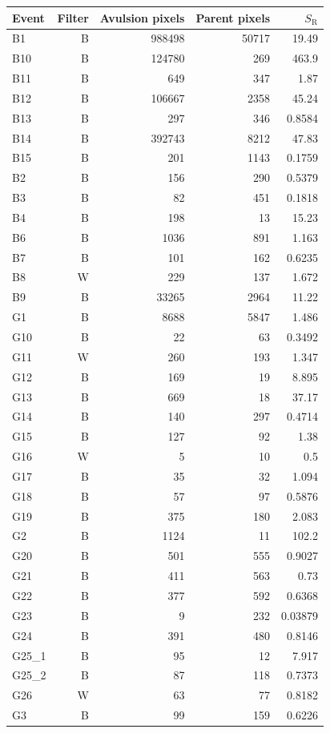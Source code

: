 \small\begin{longtable}{lrrrr}
\toprule Event & Filter & Avulsion pixels & Parent pixels & $S_{\mathrm R}$\\\midrule\endhead
B1 & B & 988498 & 50717 & 19.49\\
B10 & B & 124780 & 269 & 463.9\\
B11 & B & 649 & 347 & 1.87\\
B12 & B & 106667 & 2358 & 45.24\\
B13 & B & 297 & 346 & 0.8584\\
B14 & B & 392743 & 8212 & 47.83\\
B15 & B & 201 & 1143 & 0.1759\\
B2 & B & 156 & 290 & 0.5379\\
B3 & B & 82 & 451 & 0.1818\\
B4 & B & 198 & 13 & 15.23\\
B6 & B & 1036 & 891 & 1.163\\
B7 & B & 101 & 162 & 0.6235\\
B8 & W & 229 & 137 & 1.672\\
B9 & B & 33265 & 2964 & 11.22\\
G1 & B & 8688 & 5847 & 1.486\\
G10 & B & 22 & 63 & 0.3492\\
G11 & W & 260 & 193 & 1.347\\
G12 & B & 169 & 19 & 8.895\\
G13 & B & 669 & 18 & 37.17\\
G14 & B & 140 & 297 & 0.4714\\
G15 & B & 127 & 92 & 1.38\\
G16 & W & 5 & 10 & 0.5\\
G17 & B & 35 & 32 & 1.094\\
G18 & B & 57 & 97 & 0.5876\\
G19 & B & 375 & 180 & 2.083\\
G2 & B & 1124 & 11 & 102.2\\
G20 & B & 501 & 555 & 0.9027\\
G21 & B & 411 & 563 & 0.73\\
G22 & B & 377 & 592 & 0.6368\\
G23 & B & 9 & 232 & 0.03879\\
G24 & B & 391 & 480 & 0.8146\\
G25\_1 & B & 95 & 12 & 7.917\\
G25\_2 & B & 87 & 118 & 0.7373\\
G26 & W & 63 & 77 & 0.8182\\
G3 & B & 99 & 159 & 0.6226\\

\end{longtable}
